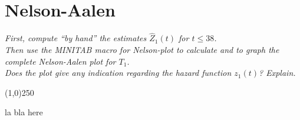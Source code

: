 \section{Nelson-Aalen}
\textit{First, compute “by hand” the estimates $\hat{Z}_1 (t)$ for $t \le 38$.\\
Then use the MINITAB macro for Nelson-plot to calculate and to graph the complete Nelson-Aalen plot for $T_1$.\\
Does the plot give any indication regarding the hazard function $z_1 (t)$? Explain.}
\begin{center}
\line(1,0){250}
\end{center}
la bla here
